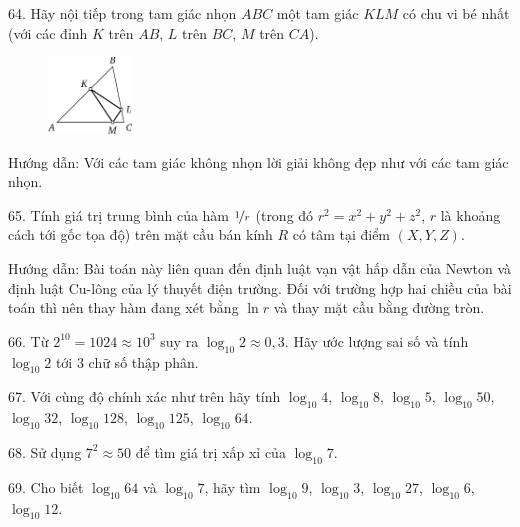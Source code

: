 \begin{problem}{64.}
	Hãy nội tiếp trong tam giác nhọn $ABC$ một tam giác $KLM$ có chu vi bé nhất (với các đỉnh $K$ trên $AB$, $L$ trên $BC$, $M$ trên $CA$).

	\begin{figure}
		\centering\includegraphics[width=0.2\textwidth]{taskbook-48}
	\end{figure}

	\begin{note}{Hướng dẫn:}
		Với các tam giác không nhọn lời giải không đẹp như với các tam giác nhọn.
	\end{note}
\end{problem}

\begin{problem}{65.}
	Tính giá trị trung bình của hàm $\nicefrac{1}{r}$ (trong đó $r^2=x^2+y^2+z^2$, $r$ là khoảng cách tới gốc tọa độ) trên mặt cầu bán kính $R$ có tâm tại điểm $(X,Y,Z)$.

	\begin{note}{Hướng dẫn:}
		Bài toán này liên quan đến định luật vạn vật hấp dẫn của Newton và định luật Cu-lông của lý thuyết điện trường. Đối với trường hợp hai chiều của bài toán thì nên thay hàm đang xét bằng $\ln r$ và thay mặt cầu bằng đường tròn.
	\end{note}
\end{problem}

\begin{problem}{66.}
	Từ $2^{10}=1024 \approx 10^3$ suy ra $\log_{10} 2\approx 0,3$. Hãy ước lượng sai số và tính $\log_{10} 2$ tới $3$ chữ số thập phân.
\end{problem}

\begin{problem}{67.}
	Với cùng độ chính xác như trên hãy tính $\log_{10} 4$, $\log_{10} 8$, $\log_{10} 5$, $\log_{10} 50$, $\log_{10} 32$, $\log_{10} 128$, $\log_{10} 125$, $\log_{10} 64$.
\end{problem}

\begin{problem}{68.}
	Sử dụng $7^2\approx 50$ để tìm giá trị xấp xỉ của $\log_{10} 7$.
\end{problem}

\begin{problem}{69.}
	Cho biết $\log_{10} 64$ và $\log_{10} 7$, hãy tìm $\log_{10} 9$, $\log_{10} 3$, $\log_{10} 27$, $\log_{10} 6$, $\log_{10} 12$.
\end{problem}


